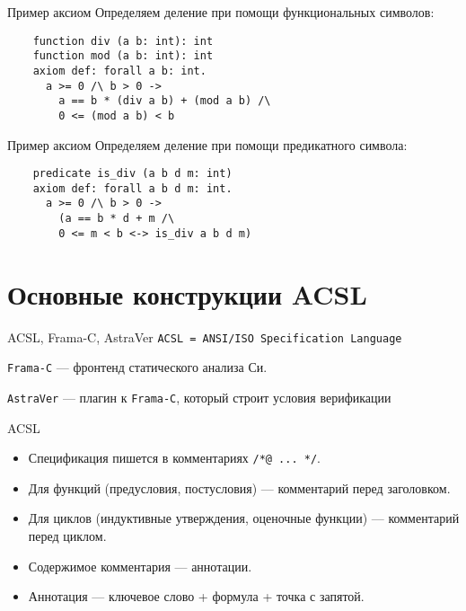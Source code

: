 \documentclass[hyperref={unicode=true}]{beamer}
\begin{document}
    \begin{frame}[fragile]{Пример аксиом}
    Определяем деление при помощи функциональных символов:
    \begin{verbatim}
    function div (a b: int): int
    function mod (a b: int): int
    axiom def: forall a b: int.
      a >= 0 /\ b > 0 ->
        a == b * (div a b) + (mod a b) /\
        0 <= (mod a b) < b
    \end{verbatim}
    \end{frame}

    \begin{frame}[fragile]{Пример аксиом}
    Определяем деление при помощи предикатного символа:
    \begin{verbatim}
    predicate is_div (a b d m: int)
    axiom def: forall a b d m: int.
      a >= 0 /\ b > 0 ->
        (a == b * d + m /\
        0 <= m < b <-> is_div a b d m)
    \end{verbatim}
    \end{frame}

    \section{Основные конструкции ACSL}

    \begin{frame}{ACSL, Frama-C, AstraVer}
    \texttt{ACSL = ANSI/ISO Specification Language}

    \texttt{Frama-C} --- фронтенд статического анализа Си.

    \texttt{AstraVer} --- плагин к \texttt{Frama-C}, который строит условия верификации
    \end{frame}

    \begin{frame}{ACSL}
    \begin{itemize}
    \item Спецификация пишется в комментариях \texttt{/*@ ... */}.
    \item Для функций (предусловия, постусловия) --- комментарий перед заголовком.
    \item Для циклов (индуктивные утверждения, оценочные функции) --- комментарий перед циклом.
    \item Содержимое комментария --- аннотации.
    \item Аннотация --- ключевое слово + формула + точка с запятой.
    \end{itemize}
    \end{frame}
\end{document}
